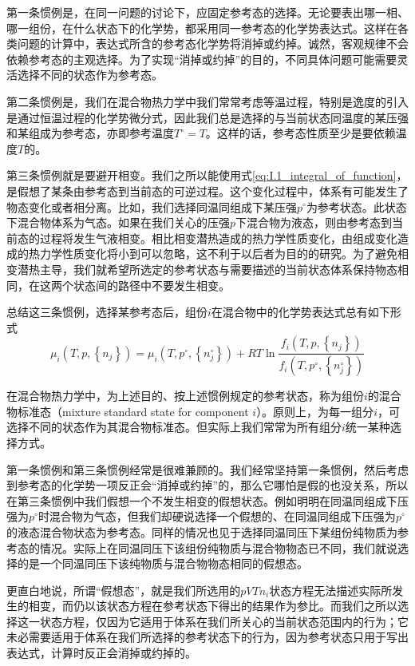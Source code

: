 \documentclass[main.tex]{subfiles}
\begin{document}
第一条惯例是，在同一问题的讨论下，应固定参考态的选择。无论要表出哪一相、哪一组份，在什么状态下的化学势，都采用同一参考态的化学势表达式。这样在各类问题的计算中，表达式所含的参考态化学势将消掉或约掉。诚然，客观规律不会依赖参考态的主观选择。为了实现“消掉或约掉”的目的，不同具体问题可能需要灵活选择不同的状态作为参考态。

第二条惯例是，我们在混合物热力学中我们常常考虑等温过程，特别是逸度的引入是通过恒温过程的化学势微分式，因此我们总是选择的与当前状态同温度的某压强和某组成为参考态，亦即参考温度$T^\circ=T$。这样的话，参考态性质至少是要依赖温度$T$的。

第三条惯例就是要避开相变。我们之所以能使用式\eqref{eq:I.1_integral_of_function}，是假想了某条由参考态到当前态的可逆过程。这个变化过程中，体系有可能发生了物态变化或者相分离。比如，我们选择同温同组成下某压强$p^\circ$为参考状态。此状态下混合物体系为气态。如果在我们关心的压强$p$下混合物为液态，则由参考态到当前态的过程将发生气液相变。相比相变潜热造成的热力学性质变化，由组成变化造成的热力学性质变化将小到可以忽略，这不利于以后者为目的的研究。为了避免相变潜热主导，我们就希望所选定的参考状态与需要描述的当前状态体系保持物态相同，在这两个状态间的路径中不要发生相变。

总结这三条惯例，选择某参考态后，组份$i$在混合物中的化学势表达式总有如下形式
\begin{equation}\label{eq:II.4_mu_standard_state}
    \mu_i\left(T,p,\left\{n_j\right\}\right)=\mu_i\left(T,p^\circ,\left\{n_j^\circ\right\}\right)+RT\ln\frac{f_i\left(T,p,\left\{n_j\right\}\right)}{f_i\left(T,p^\circ,\left\{n_j^\circ\right\}\right)}
\end{equation}

在混合物热力学中，为上述目的、按上述惯例规定的参考状态，称为组份$i$的混合物标准态（mixture standard state for component $i$）。原则上，为每一组分$i$，可选择不同的状态作为其混合物标准态。但实际上我们常常为所有组分$i$统一某种选择方式。

第一条惯例和第三条惯例经常是很难兼顾的。我们经常坚持第一条惯例，然后考虑到参考态的化学势一项反正会“消掉或约掉”的，那么它哪怕是假的也没关系，所以在第三条惯例中我们假想一个不发生相变的假想状态。例如明明在同温同组成下压强为$p^\circ$时混合物为气态，但我们却硬说选择一个假想的、在同温同组成下压强为$p^\circ$的液态混合物状态为参考态。同样的情况也见于选择同温同压下某组份纯物质为参考态的情况。实际上在同温同压下该组份纯物质与混合物物态已不同，我们就说选择的是一个同温同压下该纯物质与混合物物态相同的假想态。

更直白地说，所谓“假想态”，就是我们所选用的$pVTn_i$状态方程无法描述实际所发生的相变，而仍以该状态方程在参考状态下得出的结果作为参比。而我们之所以选择这一状态方程，仅因为它适用于体系在我们所关心的当前状态范围内的行为；它未必需要适用于体系在我们所选择的参考状态下的行为，因为参考状态只用于写出表达式，计算时反正会消掉或约掉的。
\end{document}
